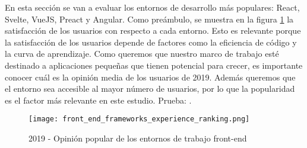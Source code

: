En esta sección se van a evaluar los entornos de desarrollo más populares: React, Svelte, VueJS, Preact y Angular. Como preámbulo, se muestra en la figura \cref{fig:stjs2019:frontend} la satisfacción de los usuarios con respecto a cada entorno. Esto es relevante porque la satisfacción de los usuarios depende de factores como la eficiencia de código y la curva de aprendizaje. Como queremos que nuestro marco de trabajo esté destinado a aplicaciones pequeñas que tienen potencial para crecer, es importante conocer cuál es la opinión media de los usuarios de 2019. Además queremos que el entorno sea accesible al mayor número de usuarios, por lo que la popularidad es el factor más relevante en este estudio. Prueba: \citet{STJS2019}.

\begin{figure}
	\centering
	\texttt{[image: front\_end\_frameworks\_experience\_ranking.png]}
	\caption{2019 - Opinión popular de los entornos de trabajo front-end}
	\label{fig:stjs2019:frontend}
\end{figure}